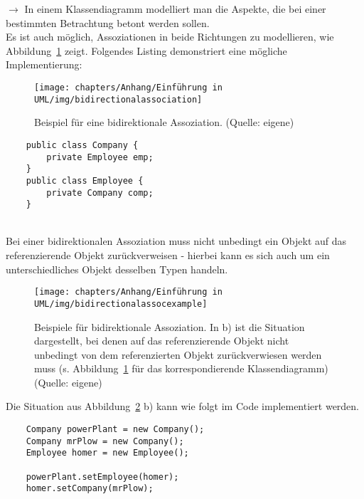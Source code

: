 \noindent
$\rightarrow$ In einem Klassendiagramm modelliert man die Aspekte, die bei einer bestimmten Betrachtung betont werden sollen.\\

\noindent
Es ist auch möglich, Assoziationen in beide Richtungen zu modellieren, wie Abbildung~\ref{fig:bidirectionalassociation} zeigt.
Folgendes Listing demonstriert eine mögliche Implementierung:

\begin{figure}
    \centering
    \texttt{[image: chapters/Anhang/Einführung in UML/img/bidirectionalassociation]}
    \caption{Beispiel für eine bidirektionale Assoziation. (Quelle: eigene)}
    \label{fig:bidirectionalassociation}
\end{figure}


\begin{verbatim}
    public class Company {
        private Employee emp;
    }
    public class Employee {
        private Company comp;
    }
\end{verbatim}\\

\noindent
    Bei einer bidirektionalen Assoziation muss nicht unbedingt ein Objekt auf das referenzierende Objekt zurückverweisen - hierbei kann es sich auch um ein unterschiedliches Objekt desselben Typen handeln.\\

\begin{figure}
    \centering
    \texttt{[image: chapters/Anhang/Einführung in UML/img/bidirectionalassocexample]}
    \caption{Beispiele für bidirektionale Assoziation. In b) ist die Situation dargestellt, bei denen auf das referenzierende Objekt nicht unbedingt von dem
    referenzierten Objekt zurückverwiesen werden muss (s. Abbildung~\ref{fig:bidirectionalassociation} für das korrespondierende Klassendiagramm) (Quelle: eigene)}
    \label{fig:bidirectionalassocexample}
\end{figure}

\newpage
Die Situation aus Abbildung~\ref{fig:bidirectionalassocexample} b) kann wie folgt im Code implementiert werden.

\begin{verbatim}
    Company powerPlant = new Company();
    Company mrPlow = new Company();
    Employee homer = new Employee();

    powerPlant.setEmployee(homer);
    homer.setCompany(mrPlow);
\end{verbatim}\\

